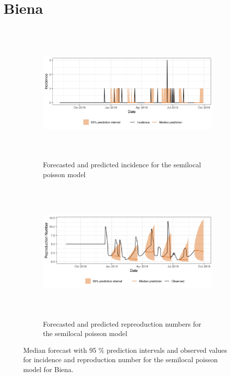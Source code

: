  \section{ Biena }\begin{figure}[H]\begin{subfigure}{\textwidth}  \centering  \includegraphics[width=0.9\linewidth, height=7cm]{../output/Biena_predictions.png}  \caption{Forecasted and predicted incidence for the semilocal poisson model}\end{subfigure}

\begin{subfigure}{\textwidth}  \centering  \includegraphics[width=0.9\linewidth, height=7cm]{../output/Biena_Rs.png}  \caption{Forecasted and predicted repreoduction numbers for the semilocal poisson model}\end{subfigure}  \caption{Median forecast with 95 \% prediction intervals and observed values for incidence and reproduction number for the semilocal poisson model for Biena.}\end{figure}

